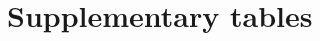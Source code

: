 \section{Supplementary tables}

\begin{table}[!htbp]
\centering\small
\caption{Top three residues by PSSM log-odds at each position, per protease (best first).}
\label{tab:topres}
\end{table}
